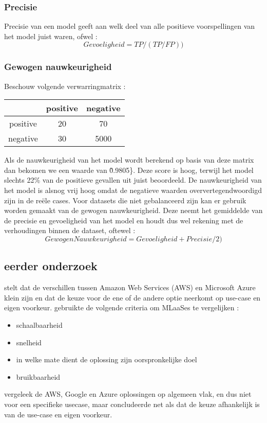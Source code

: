 \subsubsection{Precisie}
Precisie van een model geeft aan welk deel van alle positieve voorspellingen van het model juist waren, ofwel : 
\[Gevoeligheid = TP / (TP / FP) )\]

\subsubsection{Gewogen nauwkeurigheid}
Beschouw volgende verwarringmatrix : 
\begin{center}
   \begin{tabular} {|c | c | c |}
       \hline
       & positive & negative \\
       \hline
       positive & 20 & 70 \\
       \hline
       negative & 30  & 5000 \\
       \hline
   \end{tabular}
\end{center}

Als de nauwkeurigheid van het model wordt berekend op basis van deze matrix dan bekomen we een waarde van {\~0.9805}\}. Deze score is hoog, terwijl het model slechts 22\% van de positieve gevallen uit juist beoordeeld. De nauwkeurigheid van het model is alsnog vrij hoog omdat de negatieve  waarden oververtegendwoordigd zijn in de reële cases. Voor datasets die niet gebalanceerd zijn kan er gebruik worden gemaakt van de gewogen nauwkeurigheid. Deze neemt het gemiddelde van de precisie en gevoeligheid van het model en houdt dus wel rekening met de verhoudingen binnen de dataset, oftewel : 
\[Gewogen Nauwkeurigheid = Gevoeligheid + Precisie / 2 )\]

\autocite{Olugbenga2022}

\subsection{eerder onderzoek}
\textcite{Madhuri2016} stelt dat de verschillen tussen Amazon Web Services (AWS) en Microsoft Azure klein zijn en dat de keuze voor de ene of de andere optie neerkomt op use-case en eigen voorkeur. \textcite{Pinto2018} gebruikte de volgende criteria om MLaaSes te vergelijken :
\begin{itemize}
    \item schaalbaarheid
    \item snelheid
    \item in welke mate dient de oplossing zijn oorspronkelijke doel
    \item bruikbaarheid
\end{itemize}
\textcite{Pallavi2020} vergeleek de AWS, Google en Azure oplossingen op algemeen vlak, en dus niet voor een specifieke usecase, maar concludeerde net als \textcite{Madhuri2016} dat de keuze afhankelijk is van de use-case en eigen voorkeur.

